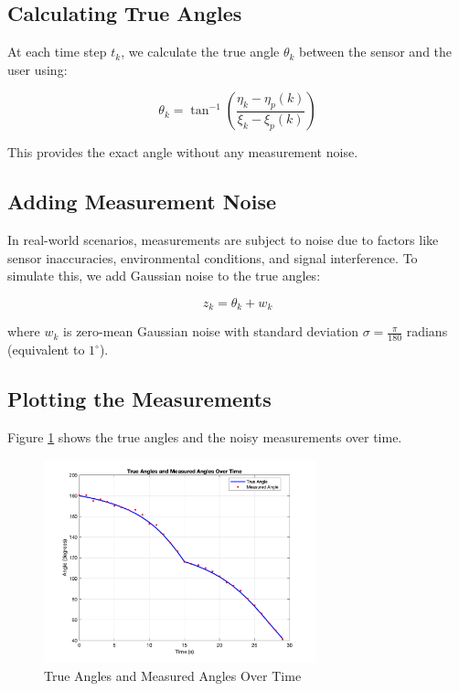 \documentclass[12pt]{article}
\begin{document}
\subsection{Calculating True Angles}

At each time step \( t_k \), we calculate the true angle \( \theta_k \) between the sensor and the user using:

\[
\theta_k = \tan^{-1} \left( \frac{\eta_k - \eta_p(k)}{\xi_k - \xi_p(k)} \right)
\]

This provides the exact angle without any measurement noise.

\subsection{Adding Measurement Noise}

In real-world scenarios, measurements are subject to noise due to factors like sensor inaccuracies, environmental conditions, and signal interference. To simulate this, we add Gaussian noise to the true angles:

\[
z_k = \theta_k + w_k
\]

where \( w_k \) is zero-mean Gaussian noise with standard deviation \( \sigma = \frac{\pi}{180} \) radians (equivalent to \( 1^\circ \)).

\subsection{Plotting the Measurements}

Figure \ref{fig:angles} shows the true angles and the noisy measurements over time.

\begin{figure}[H]
    \centering
    \includegraphics[width=0.7\textwidth]{angles.png}
    \caption{True Angles and Measured Angles Over Time}
    \label{fig:angles}
\end{figure}
\end{document}
